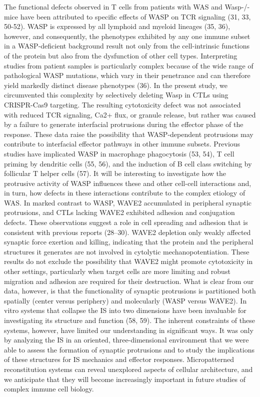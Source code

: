 The functional defects observed in T cells from patients with WAS and Wasp-/- mice have been attributed to specific effects of WASP on TCR signaling (31, 33, 50-52). WASP is expressed by all lymphoid and myeloid lineages (35, 36), however, and consequently, the phenotypes exhibited by any one immune subset in a WASP-deficient background result not only from the cell-intrinsic functions of the protein but also from the dysfunction of other cell types. Interpreting studies from patient samples is particularly complex because of the wide range of pathological WASP mutations, which vary in their penetrance and can therefore yield markedly distinct disease phenotypes (36). In the present study, we circumvented this complexity by selectively deleting Wasp in CTLs using CRISPR-Cas9 targeting. The resulting cytotoxicity defect was not associated with reduced TCR signaling, Ca2+ flux, or granule release, but rather was caused by a failure to generate interfacial protrusions during the effector phase of the response. These data raise the possibility that WASP-dependent protrusions may contribute to interfacial effector pathways in other immune subsets. Previous studies have implicated WASP in macrophage phagocytosis (53, 54), T cell priming by dendritic cells (55, 56), and the induction of B cell class switching by follicular T helper cells (57). It will be interesting to investigate how the protrusive activity of WASP influences these and other cell-cell interactions and, in turn, how defects in these interactions contribute to the complex etiology of WAS. In marked contrast to WASP, WAVE2 accumulated in peripheral synaptic protrusions, and CTLs lacking WAVE2 exhibited adhesion and conjugation defects. These observations suggest a role in cell spreading and adhesion that is consistent with previous reports (28–30). WAVE2 depletion only weakly affected synaptic force exertion and killing, indicating that the protein and the peripheral structures it generates are not involved in cytolytic mechanopotentiation. These results do not exclude the possibility that WAVE2 might promote cytotoxicity in other settings, particularly when target cells are more limiting and robust migration and adhesion are required for their destruction. What is clear from our data, however, is that the functionality of synaptic protrusions is partitioned both spatially (center versus periphery) and molecularly (WASP versus WAVE2). In vitro systems that collapse the IS into two dimensions have been invaluable for investigating its structure and function (58, 59). The inherent constraints of these systems, however, have limited our understanding in significant ways. It was only by analyzing the IS in an oriented, three-dimensional environment that we were able to assess the formation of synaptic protrusions and to study the implications of these structures for IS mechanics and effector responses. Micropatterned reconstitution systems can reveal unexplored aspects of cellular architecture, and we anticipate that they will become increasingly important in future studies of complex immune cell biology.

